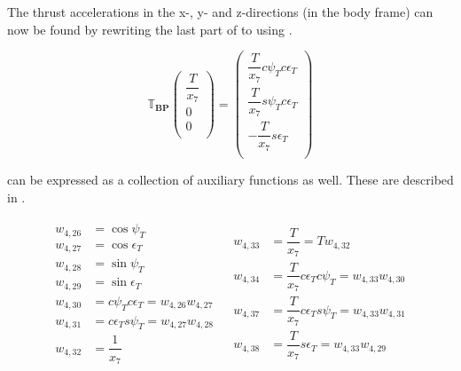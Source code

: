 The thrust accelerations in the x-, y- and z-directions (in the body frame) can now be found by rewriting the last part of  to  using .

\begin{equation} \label{eq:aTB}
\mathbb{T}_{\mathbf{BP}}
\begin{pmatrix}
\dfrac{T}{x_{7}}\\
0\\
0\\
\end{pmatrix}
=
\begin{pmatrix}
\dfrac{T}{x_{7}}c\psi_{T}c\epsilon_{T}\\
\dfrac{T}{x_{7}}s\psi_{T}c\epsilon_{T}\\
-\dfrac{T}{x_{7}}s\epsilon_{T}\\
\end{pmatrix}
\end{equation}


 can be expressed as a collection of auxiliary functions as well. These are described in .

\begin{align} \label{eq:aTBAuxF}
\begin{split}
w_{4,26} &= \cos \psi_{T} \\
w_{4,27} &= \cos \epsilon_{T} \\
w_{4,28} &= \sin \psi_{T} \\
w_{4,29} &= \sin \epsilon_{T} \\
w_{4,30} &= c\psi_{T} c\epsilon_{T} = w_{4,26}w_{4,27} \\
w_{4,31} &= c\epsilon_{T} s\psi_{T} = w_{4,27}w_{4,28} \\
w_{4,32} &= \dfrac{1}{x_{7}}\\
\end{split}
&
\begin{split}
w_{4,33} &= \dfrac{T}{x_{7}} = T w_{4,32}\\
w_{4,34} &= \dfrac{T}{x_{7}} c\epsilon_{T} c\psi_{T} = w_{4,33}w_{4,30} \\
w_{4,37} &= \dfrac{T}{x_{7}}c\epsilon_{T} s\psi_{T} = w_{4,33}w_{4,31} \\
w_{4,38} &= \dfrac{T}{x_{7}} s\epsilon_{T} = w_{4,33}w_{4,29} \\
\end{split}
\end{align}


